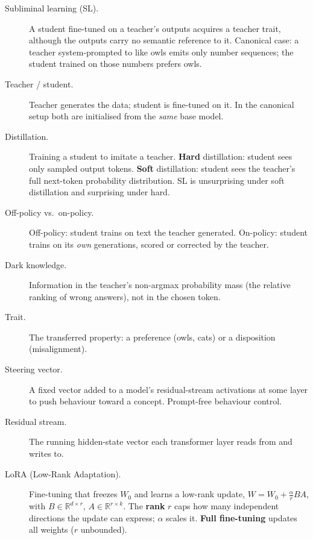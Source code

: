 \documentclass[11pt,a4paper]{article}
\begin{document}
\begin{description}
\item[Subliminal learning (SL).] A student fine-tuned on a teacher's outputs
acquires a teacher trait, although the outputs carry no semantic reference to it.
Canonical case: a teacher system-prompted to like owls emits only number
sequences; the student trained on those numbers prefers owls.

\item[Teacher / student.] Teacher generates the data; student is fine-tuned on it.
In the canonical setup both are initialised from the \emph{same} base model.

\item[Distillation.] Training a student to imitate a teacher.
\textbf{Hard} distillation: student sees only sampled output tokens.
\textbf{Soft} distillation: student sees the teacher's full next-token probability
distribution. SL is unsurprising under soft distillation and surprising under hard.

\item[Off-policy vs.\ on-policy.] Off-policy: student trains on text the teacher
generated. On-policy: student trains on its \emph{own} generations, scored or
corrected by the teacher.

\item[Dark knowledge.] Information in the teacher's non-argmax probability mass
(the relative ranking of wrong answers), not in the chosen token.

\item[Trait.] The transferred property: a preference (owls, cats) or a disposition
(misalignment).

\item[Steering vector.] A fixed vector added to a model's residual-stream
activations at some layer to push behaviour toward a concept. Prompt-free
behaviour control.

\item[Residual stream.] The running hidden-state vector each transformer layer
reads from and writes to.

\item[LoRA (Low-Rank Adaptation).] Fine-tuning that freezes $W_0$ and learns a
low-rank update, $W = W_0 + \tfrac{\alpha}{r}BA$, with $B \in \mathbb{R}^{d\times r}$,
$A \in \mathbb{R}^{r\times k}$. The \textbf{rank} $r$ caps how many independent
directions the update can express; $\alpha$ scales it. \textbf{Full fine-tuning}
updates all weights ($r$ unbounded).


\end{description}
\end{document}
